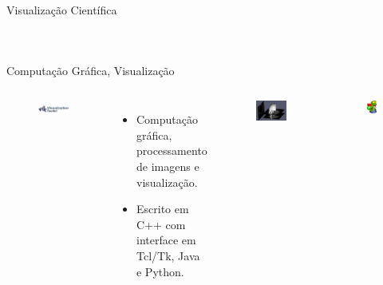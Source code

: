 \documentclass[12pt,t,graphics]{beamer}
\begin{document}
\begin{frame}[t]{Visualização Científica}
\begin{columns}
\begin{figure}
		\end{figure}
	\end{columns}
\end{frame}

\begin{frame}[t]{Computação Gráfica, Visualização}
	\vspace{-0.5cm}
	\begin{columns}
		\begin{figure}
			\centering
			\includegraphics[scale=0.45]{img/vtk100.png}
		\end{figure}
		\vspace{-0.25cm}
		\begin{itemize}
			\item Computação gráfica, processamento de
			imagens e visualização.
			\item Escrito em C++ com interface em Tcl/Tk, Java e Python.
		\end{itemize}
		\vspace{-0.35cm}
		\begin{figure}
			\centering
			\includegraphics[scale=0.35]{img/vtk_ex.jpg}
		\end{figure}
		\begin{figure}
			\centering
			\includegraphics[scale=0.45]{img/opengl.jpg}

\end{figure}
\end{columns}
\end{frame}
\end{document}
